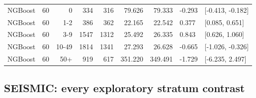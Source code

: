 \begin{longtable}{llrrrrrll}
NGBoost & 60 & 0 & 334 & 316 & 79.626 & 79.333 & -0.293 & [-0.413, -0.182]\\
NGBoost & 60 & 1-2 & 386 & 362 & 22.165 & 22.542 & 0.377 & [0.085, 0.651]\\
NGBoost & 60 & 3-9 & 1547 & 1312 & 25.492 & 26.335 & 0.843 & [0.626, 1.060]\\
NGBoost & 60 & 10-49 & 1814 & 1341 & 27.293 & 26.628 & -0.665 & [-1.026, -0.326]\\
NGBoost & 60 & 50+ & 919 & 617 & 351.220 & 349.491 & -1.729 & [-6.235, 2.497]\\
\bottomrule\end{longtable}\normalsize

\subsection{SEISMIC: every exploratory stratum contrast}
